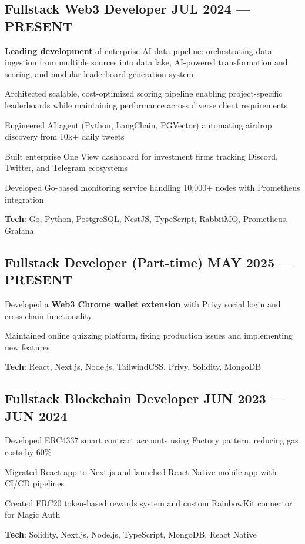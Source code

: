 \documentclass[letter,10pt]{article}
\begin{document}
\subsection{{Fullstack Web3 Developer \hfill JUL 2024 --- PRESENT}}
\begin{zitemize}
  \item \textbf{Leading development} of enterprise AI data pipeline: orchestrating data ingestion from multiple sources into data lake, AI-powered transformation and scoring, and modular leaderboard generation system
  \item Architected scalable, cost-optimized scoring pipeline enabling project-specific leaderboards while maintaining performance across diverse client requirements
  \item Engineered AI agent (Python, LangChain, PGVector) automating airdrop discovery from 10k+ daily tweets
  \item Built enterprise One View dashboard for investment firms tracking Discord, Twitter, and Telegram ecosystems
  \item Developed Go-based monitoring service handling 10,000+ nodes with Prometheus integration
  \item \textbf{Tech}: Go, Python, PostgreSQL, NestJS, TypeScript, RabbitMQ, Prometheus, Grafana
\end{zitemize}


\subsection{{Fullstack Developer (Part-time) \hfill MAY 2025 --- PRESENT}}
\begin{zitemize}
  \item Developed a \textbf{Web3 Chrome wallet extension} with Privy social login and cross-chain functionality
  \item Maintained online quizzing platform, fixing production issues and implementing new features
  \item \textbf{Tech}: React, Next.js, Node.js, TailwindCSS, Privy, Solidity, MongoDB
\end{zitemize}



\subsection{{ Fullstack Blockchain Developer \hfill JUN 2023 --- JUN 2024}}
\begin{zitemize}
  \item Developed ERC4337 smart contract accounts using Factory pattern, reducing gas costs by 60\%
  \item Migrated React app to Next.js and launched React Native mobile app with CI/CD pipelines
  \item Created ERC20 token-based rewards system and custom RainbowKit connector for Magic Auth
  \item \textbf{Tech}: Solidity, Next.js, Node.js, TypeScript, MongoDB, React Native
\end{zitemize}
\end{document}
